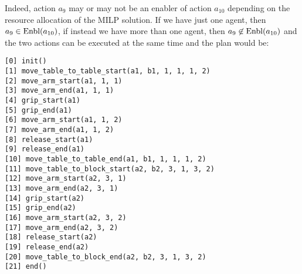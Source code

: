 Indeed, action $a_9$ may or may not be an enabler of action $a_{10}$ depending on the resource allocation of the MILP solution. If we have just one agent, then $a_9\in\text{Enbl}(a_{10})$, if instead we have more than one agent, then $a_9\not\in\text{Enbl}(a_{10})$ and the two actions can be executed at the same time and the plan would be:

\begin{verbatim}
[0] init()
[1] move_table_to_table_start(a1, b1, 1, 1, 1, 2)
[2] move_arm_start(a1, 1, 1)
[3] move_arm_end(a1, 1, 1)
[4] grip_start(a1)
[5] grip_end(a1)
[6] move_arm_start(a1, 1, 2)
[7] move_arm_end(a1, 1, 2)
[8] release_start(a1)
[9] release_end(a1)
[10] move_table_to_table_end(a1, b1, 1, 1, 1, 2)
[11] move_table_to_block_start(a2, b2, 3, 1, 3, 2)
[12] move_arm_start(a2, 3, 1)
[13] move_arm_end(a2, 3, 1)
[14] grip_start(a2)
[15] grip_end(a2)
[16] move_arm_start(a2, 3, 2)
[17] move_arm_end(a2, 3, 2)
[18] release_start(a2)
[19] release_end(a2)
[20] move_table_to_block_end(a2, b2, 3, 1, 3, 2)
[21] end()
\end{verbatim}


